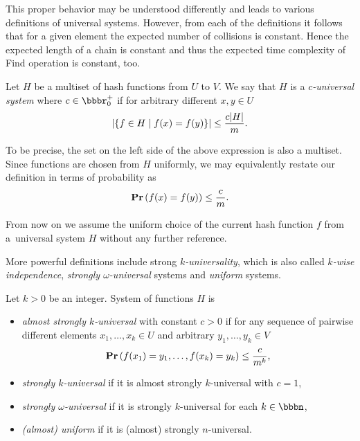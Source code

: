This proper behavior may be understood differently and leads to various definitions of universal systems. However, from each of the definitions it follows that for a given element the expected number of collisions is constant. Hence the expected length of a chain is constant and thus the expected time complexity of Find operation is constant, too.

\begin{definition}
\label{definition-c-universal-system}
Let $H$ be a multiset of hash functions from $U$ to $V$. We say that $H$ is a \emph{$c$-universal system} where $c \in \bbbr_0^+$ if for arbitrary different $x, y \in U$
\[
\left|\lbrace f \in H \mid f(x) = f(y) \rbrace\right| \leq \frac{c|H|}{m}.
\]
\end{definition}

To be precise, the set on the left side of the above expression is also a multiset. Since functions are chosen from $H$ uniformly, we may equivalently restate our definition in terms of probability as
\[
\mathbf{Pr}\left(f(x) = f(y)\right) \leq \frac{c}{m}.
\]

From now on we assume the uniform choice of the current hash function $f$ from a~universal system $H$ without any further reference.

More powerful definitions include strong \emph{$k$-universality}, which is also called \emph{$k$-wise independence}, \emph{strongly $\omega$-universal} systems and \emph{uniform} systems.
\begin{definition}
Let $k > 0$ be an integer. System of functions $H$ is
\begin{itemize}
	\item \emph{almost strongly $k$-universal} with constant $c > 0$ if for any sequence of pairwise different elements $x_1, \dots, x_k \in U$ and arbitrary $y_1, \dots, y_k \in V$ \[\mathbf{Pr}\left(f(x_1) = y_1, \dots, f(x_k) = y_k\right) \leq \frac{c}{m^k}\mbox{,}\]
	\item \emph{strongly $k$-universal} \cite{DBLP:conf/focs/WegmanC79} if it is almost strongly $k$-universal with $c = 1$,
	\item \emph{strongly $\omega$-universal} \cite{DBLP:conf/focs/WegmanC79} if it is strongly $k$-universal for each $k \in \bbbn$,
	\item \emph{(almost) uniform} \cite{DBLP:journals/siamcomp/PaghP08} if it is (almost) strongly $n$-universal.
\end{itemize}
\end{definition}

